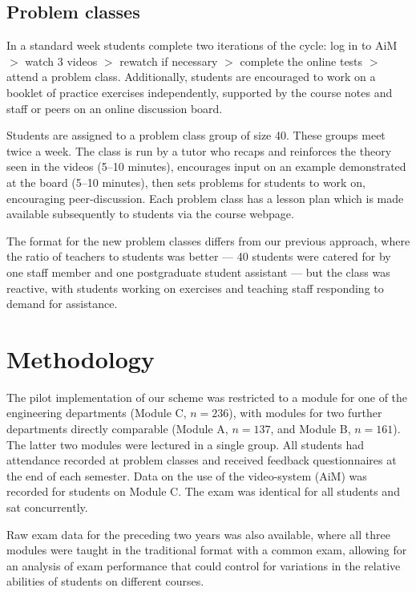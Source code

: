 \documentclass{amsart}
\begin{document}
\subsection{Problem classes}

In a standard week students complete two iterations of the cycle: log in to AiM $>$ watch 3 videos $>$ rewatch if necessary $>$ complete the online tests $>$ attend a problem class. Additionally, students are encouraged to work on a booklet of practice exercises independently, supported by the course notes and staff or peers on an online discussion board.

Students are assigned to a problem class group of size 40.  These groups meet twice a week.  The class is run by a tutor who recaps and reinforces the theory seen in the videos (5--10 minutes), encourages input on an example demonstrated at the board (5--10 minutes), then sets problems for students to work on, encouraging peer-discussion.  Each problem class has a lesson plan which is made available subsequently to students via the course webpage.

The format for the new problem classes differs from our previous approach, where the ratio of teachers to students was better --- 40 students were catered for by one staff member and one postgraduate student assistant --- but the class was reactive, with students working on exercises and teaching staff responding to demand for assistance.


\section{Methodology}

The pilot implementation of our scheme was restricted to a module for one of the engineering departments (Module C, $n=236$), with modules for two further departments directly comparable (Module A, $n=137$, and Module B, $n=161$).  The latter two modules were lectured in a single group.  All students had attendance recorded at problem classes and received feedback questionnaires at the end of each semester.  Data on the use of the video-system (AiM) was recorded for students on Module C.  The exam was identical for all students and sat concurrently.

Raw exam data for the preceding two years was also available, where all three modules were taught in the traditional format with a common exam, allowing for an analysis of exam performance that could control for variations in the relative abilities of students on different courses.
\end{document}
